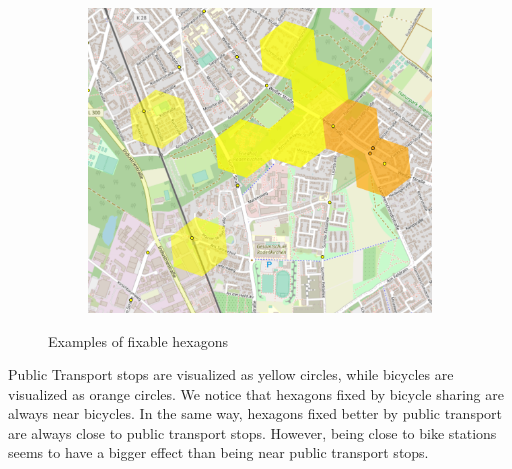 \begin{figure}
\begin{subfigure}[b]{0.45\textwidth}
     \end{subfigure}
     \hfill
     \begin{subfigure}[b]{0.45\textwidth}
         \centering
         \includegraphics[width=\textwidth]{Figures/results/problematic_hexagons/example_4.png}
     \end{subfigure}
     \caption{Examples of fixable hexagons}
        \label{fig:fixable_hexagons_examples}
\end{figure}
Public Transport stops are visualized as yellow circles, while bicycles are visualized as orange circles.
We notice that hexagons fixed by bicycle sharing are always near bicycles.
In the same way, hexagons fixed better by public transport are always close to public transport stops. 
However, being close to bike stations seems to have a bigger effect than being near public transport stops.

